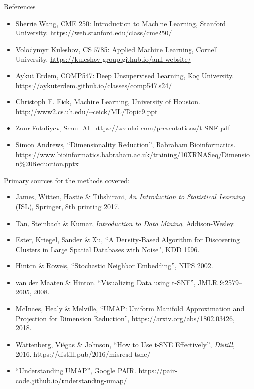\begin{frame}[allowframebreaks]{References}
    \begin{itemize}
        \item Sherrie Wang, CME 250: Introduction to Machine Learning, Stanford University. \url{https://web.stanford.edu/class/cme250/}
        \item Volodymyr Kuleshov, CS 5785: Applied Machine Learning, Cornell University. \url{https://kuleshov-group.github.io/aml-website/}
        \item Aykut Erdem, COMP547: Deep Unsupervised Learning, Koç University. \url{https://aykuterdem.github.io/classes/comp547.s24/}
        \item Christoph F. Eick, Machine Learning, University of Houston. \url{http://www2.cs.uh.edu/~ceick/ML/Topic9.ppt}
        \item Zaur Fataliyev, Seoul AI. \url{https://seoulai.com/presentations/t-SNE.pdf}
        \item Simon Andrews, ``Dimensionality Reduction'', Babraham Bioinformatics. \url{https://www.bioinformatics.babraham.ac.uk/training/10XRNASeq/Dimension\%20Reduction.pptx}
    \end{itemize}

\framebreak

    Primary sources for the methods covered:
    \small
    \begin{itemize}
        \setlength{\itemsep}{0.2em}
        \item James, Witten, Hastie \& Tibshirani, \emph{An Introduction to Statistical Learning} (ISL), Springer, 8th printing 2017.
        \item Tan, Steinbach \& Kumar, \emph{Introduction to Data Mining}, Addison-Wesley.
        \item Ester, Kriegel, Sander \& Xu, ``A Density-Based Algorithm for Discovering Clusters in Large Spatial Databases with Noise'', KDD 1996.
        \item Hinton \& Roweis, ``Stochastic Neighbor Embedding'', NIPS 2002.
        \item van der Maaten \& Hinton, ``Visualizing Data using t-SNE'', JMLR 9:2579--2605, 2008.
        \item McInnes, Healy \& Melville, ``UMAP: Uniform Manifold Approximation and Projection for Dimension Reduction'', \url{https://arxiv.org/abs/1802.03426}, 2018.
        \item Wattenberg, Vi\'egas \& Johnson, ``How to Use t-SNE Effectively'', \emph{Distill}, 2016. \url{https://distill.pub/2016/misread-tsne/}
        \item ``Understanding UMAP'', Google PAIR. \url{https://pair-code.github.io/understanding-umap/}
    \end{itemize}
\end{frame}
